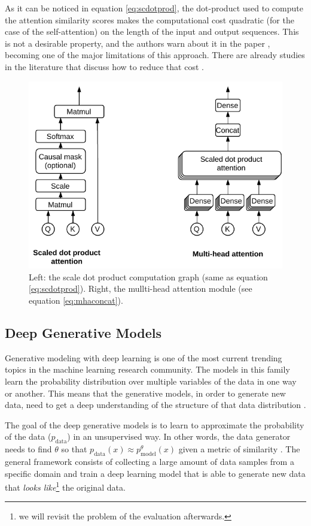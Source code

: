 As it can be noticed in equation \ref{eq:scdotprod}, the dot-product used to compute the attention similarity scores makes the computational cost quadratic (for the case of the self-attention) on the length of the input and output sequences. This is not a desirable property, and the authors warn about it in the paper \cite{vaswani2017}, becoming one of the major limitations of this approach. There are already studies in the literature that discuss how to reduce that cost \cite{jaegle2021, so2021}.

\begin{figure}
	\centering
	\includegraphics[width=0.85\linewidth]{chapter2/images/attention_modules}
	\caption{Left: the scale dot product computation graph (same as equation \ref{eq:scdotprod}). Right, the mullti-head attention module (see equation \ref{eq:mhaconcat}).}
	\label{fig:attentionmodules}
\end{figure}

\subsection{Deep Generative Models}
Generative modeling with deep learning is one of the most current trending topics in the machine learning research community. The models in this family learn the probability distribution over multiple variables of the data in one way or another. This means that the generative models, in order to generate new data, need to get a deep understanding of the structure of that data distribution \cite{Goodfellow2016}.

The goal of the deep generative models is to learn to approximate the probability of the data ($p_\mathrm{data}$) in an unsupervised way. In other words, the data generator needs to find $\theta$ so that $p_\mathrm{data}(x) \approx p_\mathrm{model}^\theta(x)$ given a metric of similarity \cite{Goodfellow2016}. The general framework consists of collecting a large amount of data samples from a specific domain and train a deep learning model that is able to generate new data that \textit{looks like}\footnote{we will revisit the problem of the evaluation afterwards.} the original data. 

